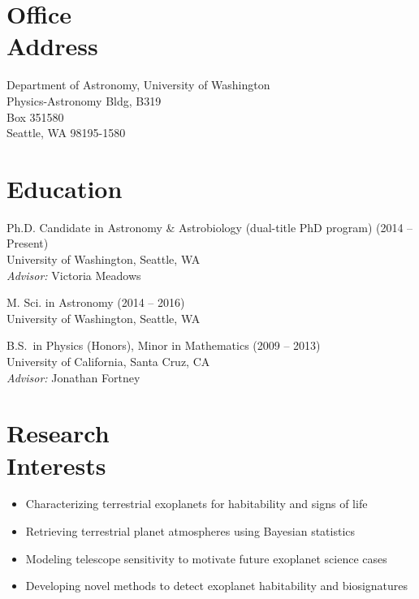 \documentclass[margin,10pt]{res}
\begin{document}
\begin{resume}

\section{Office \\Address}
Department of Astronomy, University of Washington \\
Physics-Astronomy Bldg, B319 \\
Box 351580 \\
Seattle, WA 98195-1580 \\

\section{Education} 
Ph.D. Candidate in Astronomy \& Astrobiology (dual-title PhD program) \hfill (2014 -- Present) \\
University of Washington, Seattle, WA  \\
\textit{Advisor:} Victoria Meadows 

M. Sci. in Astronomy \hfill (2014 -- 2016) \\
University of Washington, Seattle, WA 

B.S.\ in Physics (Honors), Minor in Mathematics \hfill (2009 -- 2013) \\
University of California, Santa Cruz, CA \\
\textit{Advisor:} Jonathan Fortney \\

\section{Research \\Interests}
                \begin{itemize}  \itemsep -1pt %
                        \item Characterizing terrestrial exoplanets for habitability and signs of life 
                        \item Retrieving terrestrial planet atmospheres using Bayesian statistics 
                        \item Modeling telescope sensitivity to motivate future exoplanet science cases 
                        \item Developing novel methods to detect exoplanet habitability and biosignatures \\
                    \end{itemize}


\end{resume}
\end{document}
